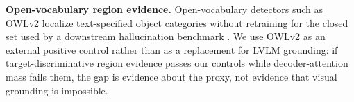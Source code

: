 \noindent\textbf{Open-vocabulary region evidence.}
Open-vocabulary detectors such as OWLv2 localize text-specified object categories without retraining for the closed set used by a downstream hallucination benchmark \cite{minderer2023scaling}. We use OWLv2 as an external positive control rather than as a replacement for LVLM grounding: if target-discriminative region evidence passes our controls while decoder-attention mass fails them, the gap is evidence about the proxy, not evidence that visual grounding is impossible.
